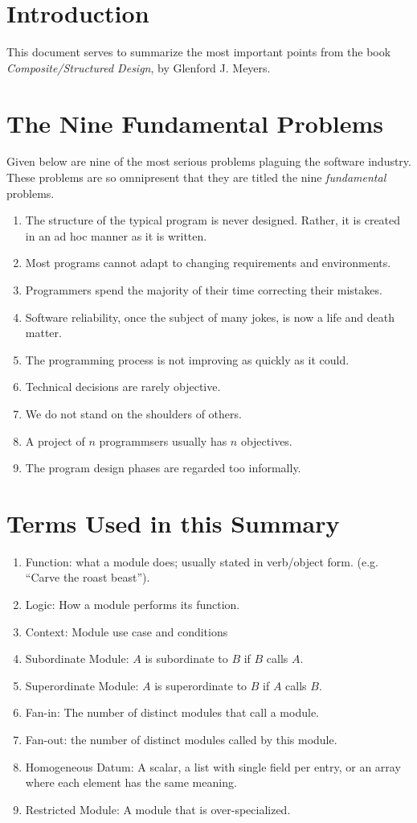 \documentclass{designdoc}
\begin{document}
\section{Introduction}
This document serves to summarize the most important points from the book
{\it Composite/Structured Design}, by Glenford J. Meyers.

\section{The Nine Fundamental Problems}
Given below are nine of the most serious problems plaguing the software
industry. These problems are so omnipresent that they are titled the nine
{\it fundamental} problems.

\begin{enumerate}
\item The structure of the typical program is never designed. Rather, it is
  created in an ad hoc manner as it is written.
\item Most programs cannot adapt to changing requirements and environments.
\item Programmers spend the majority of their time correcting their mistakes.
\item Software reliability, once the subject of many jokes, is now a life and
  death matter.
\item The programming process is not improving as quickly as it could.
\item Technical decisions are rarely objective.
\item We do not stand on the shoulders of others.
\item A project of $n$ programmsers usually has $n$ objectives.
\item The program design phases are regarded too informally.
\end{enumerate}

\section{Terms Used in this Summary}
\begin{enumerate}
\item Function: what a module does; usually stated in verb/object form. (e.g.
  ``Carve the roast beast'').
\item Logic: How a module performs its function.
\item Context: Module use case and conditions
\item Subordinate Module: $A$ is subordinate to $B$ if $B$ calls $A$.
\item Superordinate Module: $A$ is superordinate to $B$ if $A$ calls $B$.
\item Fan-in: The number of distinct modules that call a module.
\item Fan-out: the number of distinct modules called by this module.
\item Homogeneous Datum: A scalar, a list with single field per entry, or an
  array where each element has the same meaning.
\item Restricted Module: A module that is over-specialized.
\end{enumerate}
\end{document}
